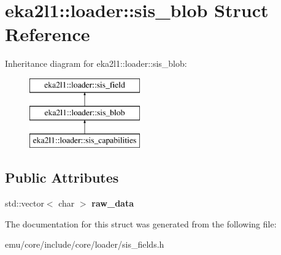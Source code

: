 \hypertarget{structeka2l1_1_1loader_1_1sis__blob}{}\section{eka2l1\+:\+:loader\+:\+:sis\+\_\+blob Struct Reference}
\label{structeka2l1_1_1loader_1_1sis__blob}
Inheritance diagram for eka2l1\+:\+:loader\+:\+:sis\+\_\+blob\+:\begin{figure}[H]
\begin{center}
\leavevmode
\includegraphics[height=3.000000cm]{structeka2l1_1_1loader_1_1sis__blob}
\end{center}
\end{figure}
\subsection*{Public Attributes}
\begin{DoxyCompactItemize}
\item 
\mbox{\label{structeka2l1_1_1loader_1_1sis__blob_ad197dc10600f2657ca7e8ac4dfa82987}} 
std\+::vector$<$ char $>$ {\bfseries raw\+\_\+data}
\end{DoxyCompactItemize}


The documentation for this struct was generated from the following file\+:\begin{DoxyCompactItemize}
\item 
emu/core/include/core/loader/sis\+\_\+fields.\+h\end{DoxyCompactItemize}
